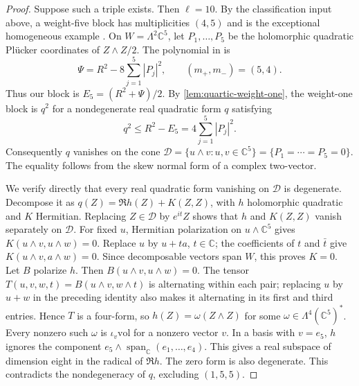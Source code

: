 \begin{proof}
Suppose such a triple exists. Then $\ell=10$. By the classification
input above, a weight-five block has multiplicities $(4,5)$ and is
the exceptional homogeneous example \cite{ChiFourIII13}.
On $W=\Lambda^2\mathbb C^5$, let $P_1,\ldots,P_5$ be the
holomorphic quadratic Pl\"ucker coordinates of $Z\wedge Z/2$.
The polynomial in \cite[Section~3, equation~(3.2)]{GeTangSOS23} is
\[
 \Psi=R^2-8\sum_{j=1}^5|P_j|^2,
 \qquad (m_+,m_-)=(5,4).
\]
Thus our block is $E_5=(R^2+\Psi)/2$. By
\cref{lem:quartic-weight-one}, the weight-one block is $q^2$ for
a nondegenerate real quadratic form $q$ satisfying
\[
 q^2\le R^2-E_5=4\sum_{j=1}^5|P_j|^2.
\]
Consequently $q$ vanishes on the cone
$\mathcal D=\{u\wedge v:u,v\in\mathbb C^5\}=\{P_1=\cdots=P_5=0\}$.
The equality follows from the skew normal form of a complex
two-vector.

We verify directly that every real quadratic form vanishing on
$\mathcal D$ is degenerate. Decompose it as
$q(Z)=\Re h(Z)+K(Z,Z)$, with $h$ holomorphic quadratic and $K$
Hermitian. Replacing $Z\in\mathcal D$ by $e^{it}Z$ shows that
$h$ and $K(Z,Z)$ vanish separately on $\mathcal D$.
For fixed $u$, Hermitian polarization on $u\wedge\mathbb C^5$ gives
$K(u\wedge v,u\wedge w)=0$.
Replace $u$ by $u+ta$, $t\in\mathbb C$; the coefficients of $t$
and $\bar t$ give $K(u\wedge v,a\wedge w)=0$. Since decomposable
vectors span $W$, this proves $K=0$.
Let $B$ polarize $h$. Then $B(u\wedge v,u\wedge w)=0$.
The tensor $T(u,v,w,t)=B(u\wedge v,w\wedge t)$ is alternating
within each pair; replacing $u$ by $u+w$ in the preceding identity
also makes it alternating in its first and third entries. Hence
$T$ is a four-form, so $h(Z)=\omega(Z\wedge Z)$ for some
$\omega\in\Lambda^4(\mathbb C^5)^*$.
Every nonzero such $\omega$ is $\iota_v\mathrm{vol}$ for a nonzero
vector $v$. In a basis with $v=e_5$, $h$ ignores the component
$e_5\wedge\operatorname{span}_{\mathbb C}(e_1,\ldots,e_4)$.
This gives a real subspace of dimension eight in the radical of
$\Re h$. The zero form is also degenerate. This contradicts the
nondegeneracy of $q$, excluding $(1,5,5)$.
\end{proof}

